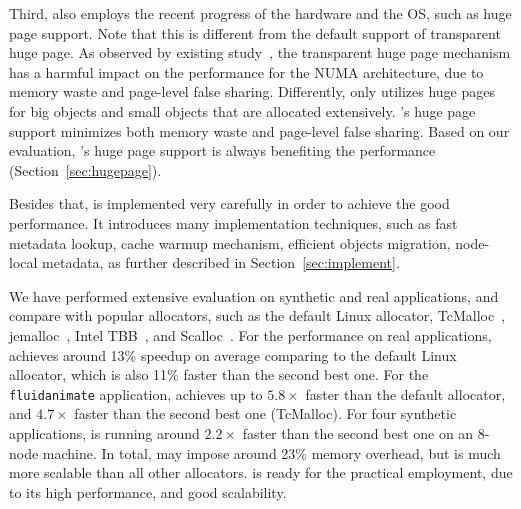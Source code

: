  Third, \NM{} also employs the recent progress of the hardware and the OS, such as huge page support. Note that this is different from the default support of transparent huge page. As observed by existing study~\cite{Gaud:2014:LPM:2643634.2643659, DBLP:conf/asplos/PanwarBG19}, the transparent huge page mechanism has a harmful impact on the performance for the NUMA architecture, due to memory waste and page-level false sharing. Differently, \NM{} only utilizes huge pages for big objects and small objects that are allocated extensively. \NM{}'s huge page support minimizes both memory waste and page-level false sharing. Based on our evaluation, \NM{}'s huge page support is always benefiting the performance (Section~\ref{sec:hugepage}). 
 
 Besides that, \NM{} is implemented very carefully in order to achieve the good performance. It introduces many implementation techniques, such as fast metadata lookup, cache warmup mechanism, efficient objects migration, node-local metadata, as further described in Section~\ref{sec:implement}. 
 



We have performed extensive evaluation on synthetic and real applications, and compare \NM{} with popular allocators, such as the default Linux allocator, TcMalloc~\cite{tcmalloc}, jemalloc~\cite{jemalloc}, Intel TBB~\cite{tbb}, and Scalloc~\cite{Scalloc}. For the performance on real applications, \NM{} achieves around 13\% speedup on average comparing to the default Linux allocator, which is also 11\% faster than the second best one. For the \texttt{fluidanimate} application, \NM{} achieves up to $5.8\times$ faster than the default allocator, and $4.7\times$ faster than the second best one (TcMalloc). For four synthetic applications, \NM{} is running around $2.2\times$ faster than the second best one on an 8-node machine. In total, \NM{} may impose around 23\% memory overhead, but is much more scalable than all other allocators.  \NM{} is ready for the practical employment, due to its high performance, and good scalability. 

